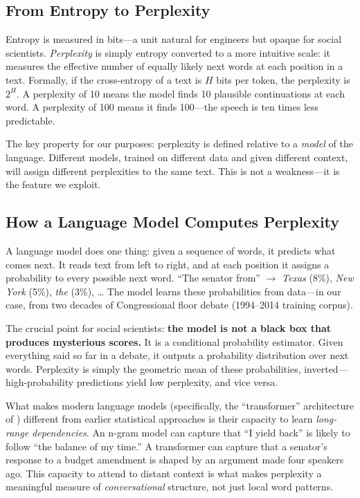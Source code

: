 \documentclass[12pt]{article}
\begin{document}
\subsection{From Entropy to Perplexity}

Entropy is measured in bits---a unit natural for engineers but opaque for social scientists. \textit{Perplexity} is simply entropy converted to a more intuitive scale: it measures the effective number of equally likely next words at each position in a text. Formally, if the cross-entropy of a text is $H$ bits per token, the perplexity is $2^H$. A perplexity of 10 means the model finds 10 plausible continuations at each word. A perplexity of 100 means it finds 100---the speech is ten times less predictable.

The key property for our purposes: perplexity is defined relative to a \textit{model} of the language. Different models, trained on different data and given different context, will assign different perplexities to the same text. This is not a weakness---it is the feature we exploit.

\subsection{How a Language Model Computes Perplexity}

A language model does one thing: given a sequence of words, it predicts what comes next. It reads text from left to right, and at each position it assigns a probability to every possible next word. ``The senator from'' $\rightarrow$ \textit{Texas} (8\%), \textit{New York} (5\%), \textit{the} (3\%), \ldots{} The model learns these probabilities from data---in our case, from two decades of Congressional floor debate (1994--2014 training corpus).

The crucial point for social scientists: \textbf{the model is not a black box that produces mysterious scores.} It is a conditional probability estimator. Given everything said so far in a debate, it outputs a probability distribution over next words. Perplexity is simply the geometric mean of these probabilities, inverted---high-probability predictions yield low perplexity, and vice versa.

What makes modern language models (specifically, the ``transformer'' architecture of \citealt{vaswani2017}) different from earlier statistical approaches is their capacity to learn \textit{long-range dependencies}. An n-gram model can capture that ``I yield back'' is likely to follow ``the balance of my time.'' A transformer can capture that a senator's response to a budget amendment is shaped by an argument made four speakers ago. This capacity to attend to distant context is what makes perplexity a meaningful measure of \textit{conversational} structure, not just local word patterns.
\end{document}
